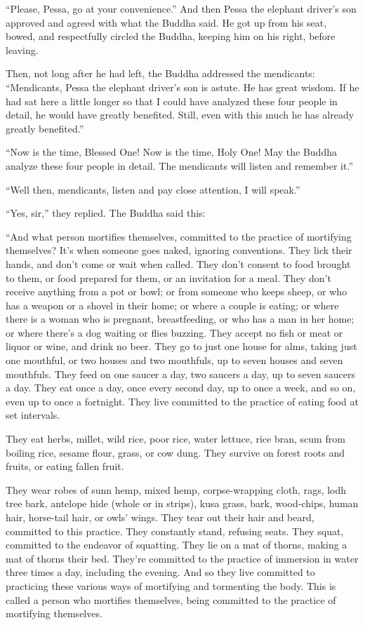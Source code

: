 \documentclass[12pt,openany]{book}%
\begin{document}
“Please, Pessa, go at your convenience.” And then Pessa the elephant driver’s son approved and agreed with what the Buddha said. He got up from his seat, bowed, and respectfully circled the Buddha, keeping him on his right, before leaving. 

Then, not long after he had left, the Buddha addressed the mendicants: “Mendicants, Pessa the elephant driver’s son is astute. He has great wisdom. If he had sat here a little longer so that I could have analyzed these four people in detail, he would have greatly benefited. Still, even with this much he has already greatly benefited.” 

“Now is the time, Blessed One! Now is the time, Holy One! May the Buddha analyze these four people in detail. The mendicants will listen and remember it.” 

“Well then, mendicants, listen and pay close attention, I will speak.” 

“Yes, sir,” they replied. The Buddha said this: 

“And what person mortifies themselves, committed to the practice of mortifying themselves? It’s when someone goes naked, ignoring conventions. They lick their hands, and don’t come or wait when called. They don’t consent to food brought to them, or food prepared for them, or an invitation for a meal. They don’t receive anything from a pot or bowl; or from someone who keeps sheep, or who has a weapon or a shovel in their home; or where a couple is eating; or where there is a woman who is pregnant, breastfeeding, or who has a man in her home; or where there’s a dog waiting or flies buzzing. They accept no fish or meat or liquor or wine, and drink no beer. They go to just one house for alms, taking just one mouthful, or two houses and two mouthfuls, up to seven houses and seven mouthfuls. They feed on one saucer a day, two saucers a day, up to seven saucers a day. They eat once a day, once every second day, up to once a week, and so on, even up to once a fortnight. They live committed to the practice of eating food at set intervals. 

They eat herbs, millet, wild rice, poor rice, water lettuce, rice bran, scum from boiling rice, sesame flour, grass, or cow dung. They survive on forest roots and fruits, or eating fallen fruit. 

They wear robes of sunn hemp, mixed hemp, corpse-wrapping cloth, rags, lodh tree bark, antelope hide (whole or in strips), kusa grass, bark, wood-chips, human hair, horse-tail hair, or owls’ wings. They tear out their hair and beard, committed to this practice. They constantly stand, refusing seats. They squat, committed to the endeavor of squatting. They lie on a mat of thorns, making a mat of thorns their bed. They’re committed to the practice of immersion in water three times a day, including the evening. And so they live committed to practicing these various ways of mortifying and tormenting the body. This is called a person who mortifies themselves, being committed to the practice of mortifying themselves. 
\end{document}
